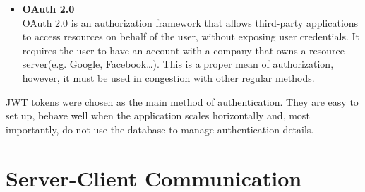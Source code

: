 \begin{itemize}
    \item \textbf{OAuth 2.0} \\
    OAuth 2.0 is an authorization framework that allows third-party applications to access resources
    on behalf of the user, without exposing user credentials.\cite{oauth2} It requires the user to have an account
    with a company that owns a resource server(e.g. Google, Facebook\ldots). This is a proper mean of
    authorization, however, it must be used in congestion with other regular methods.
\end{itemize}

JWT tokens were chosen as the main method of authentication. They are easy to set up, behave well when the
application scales horizontally and, most importantly, do not use the database to manage authentication details.


\section{Server-Client Communication}
